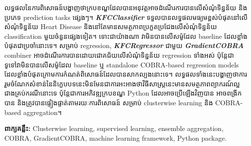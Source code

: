 \begin{khmer}
លទ្ធផលនៃការពិសោធន៍បង្ហាញថាក្របខណ្ឌដែលបានអនុវត្តអាចដំណើរការបានលើសំណុំទិន្នន័យ និងប្រភេទ prediction tasks ផ្សេងៗ។ \textbf{\textit{KFCClassifier}} ទទួលបានលទ្ធផលមធ្យមខ្ពស់បំផុតនៅលើសំណុំទិន្នន័យ Heart Disease និងនៅតែមានសមត្ថភាពប្រកួតប្រជែងលើសំណុំទិន្នន័យ classification មួយចំនួនផ្សេងទៀត។ ទោះជាយ៉ាងណា វាមិនបានលើសម៉ូដែល baseline ដែលខ្លាំងបំផុតជាប្រចាំនោះទេ។ សម្រាប់ regression, \textbf{\textit{KFCRegressor}} ជាមួយ \textbf{\textit{GradientCOBRA}} combiner អាចដំណើរការបានដោយជោគជ័យលើសំណុំទិន្នន័យ regression ទាំងអស់ ប៉ុន្តែជាទូទៅវាមិនបានលើសម៉ូដែល baseline ឬ standalone COBRA-based regression models ដែលខ្លាំងបំផុតក្រោមការកំណត់ពិសោធន៍ដែលបានសាកល្បងនោះទេ។ លទ្ធផលទាំងនេះបង្ហាញថាការរួមចំណែកសំខាន់នៃនិក្ខេបបទនេះមិនមែនជាការអះអាងថាវិធីសាស្ត្រនេះមានសមត្ថភាពព្យាករណ៍ល្អជាងគ្រប់ករណីនោះទេ ប៉ុន្តែជាការអភិវឌ្ឍក្របខណ្ឌ Python ដែលអាចប្រើឡើងវិញបាន អាចពង្រីកបាន និងត្រូវបានផ្ទៀងផ្ទាត់តាមរយៈការពិសោធន៍ សម្រាប់ clusterwise learning និង COBRA-based aggregation។

\vspace{0.5cm}
\noindent\textbf{ពាក្យគន្លឹះ:} Clusterwise learning, supervised learning, ensemble aggregation, COBRA, GradientCOBRA, machine learning framework, Python package.

\end{khmer}
